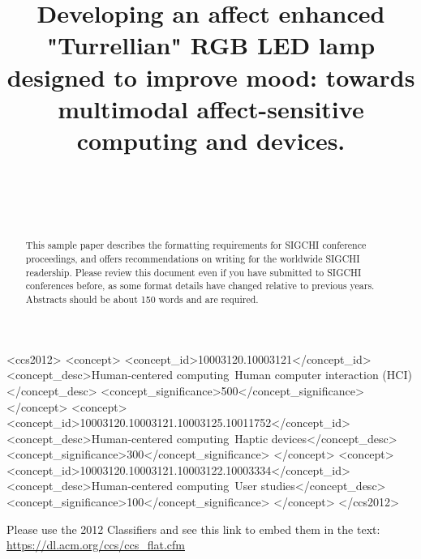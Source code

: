 \documentclass{sigchi}
\def\plainkeywords{Authors' choice; of terms; separated; by
  semicolons; include commas, within terms only; this section is required.}
\begin{document}
\title{Developing an affect enhanced "Turrellian" RGB LED lamp designed to improve mood: towards multimodal affect-sensitive computing and devices.}

\author{
\\
\\
\\
}


\maketitle

\begin{abstract}
  This sample paper describes the formatting
  requirements for SIGCHI conference proceedings, and offers
  recommendations on writing for the worldwide SIGCHI
  readership. Please review this document even if you have submitted
  to SIGCHI conferences before, as some format details have changed
  relative to previous years. Abstracts should be about 150 words and
  are required.
\end{abstract}



\begin{CCSXML}
<ccs2012>
<concept>
<concept_id>10003120.10003121</concept_id>
<concept_desc>Human-centered computing~Human computer interaction (HCI)</concept_desc>
<concept_significance>500</concept_significance>
</concept>
<concept>
<concept_id>10003120.10003121.10003125.10011752</concept_id>
<concept_desc>Human-centered computing~Haptic devices</concept_desc>
<concept_significance>300</concept_significance>
</concept>
<concept>
<concept_id>10003120.10003121.10003122.10003334</concept_id>
<concept_desc>Human-centered computing~User studies</concept_desc>
<concept_significance>100</concept_significance>
</concept>
</ccs2012>
\end{CCSXML}



Please use the 2012 Classifiers and see this link to embed them in the text: \url{https://dl.acm.org/ccs/ccs_flat.cfm}
\end{document}
